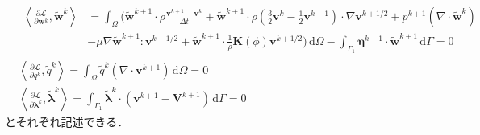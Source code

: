 \documentclass[a4paper,xelatex,ja=standard]{bxjsarticle}
\begin{document}
\begin{align}
    &\begin{aligned}
        \label{eq:foward_w}
        \left\langle\frac{\partial \mathcal{L}}{\partial \mathbf{w}^k}, \tilde{\mathbf{w}}^k\right\rangle
        & = \int_{\Omega} \bigg( \tilde{\mathbf{w}}^{k+1} \cdot \rho\frac{\mathbf{v}^{k+1}-\mathbf{v}^k}{\Delta t}
        +\tilde{\mathbf{w}}^{k+1} \cdot \rho \left( \frac{3}{2}\mathbf{v}^k - \frac{1}{2}\mathbf{v}^{k-1} \right) \cdot \nabla \mathbf{v}^{k+1 / 2} 
        + p^{k+1} (\nabla \cdot \tilde{\mathbf{w}}^{k}) \\
        &- \mu \nabla \tilde{\mathbf{w}}^{k+1} : \mathbf{v}^{k+1/2} + \tilde{\mathbf{w}}^{k+1} \cdot \frac{1}{\rho}\mathbf{K}(\phi) \mathbf{v}^{k+1/2} \bigg) \, \mathrm{d}\Omega
        - \int_{\Gamma_1} \boldsymbol{\eta}^{k+1} \cdot \tilde{\mathbf{w}}^{k+1} \, \mathrm{d}\Gamma = 0
    \end{aligned} \\
    \label{eq:foward_q} 
    & \left\langle\frac{\partial \mathcal{L}}{\partial q^k}, \tilde{q}^k\right\rangle
    =\int_{\Omega} \tilde{q}^k(\nabla \cdot \mathbf{v}^{k+1}) \, \mathrm{d}\Omega
    = 0 \\
    \label{eq:foward_lambda} 
    &\left\langle\frac{\partial \mathcal{L}}{\partial \boldsymbol{\lambda}^k}, \tilde{\boldsymbol{\lambda}}^k\right\rangle
    = \int_{\Gamma_1} \tilde{\boldsymbol{\lambda}}^k \cdot (\mathbf{v}^{k+1} - \mathbf{V}^{k+1}) \, \mathrm{d}\Gamma
    = 0
\end{align}
とそれぞれ記述できる．
\end{document}

